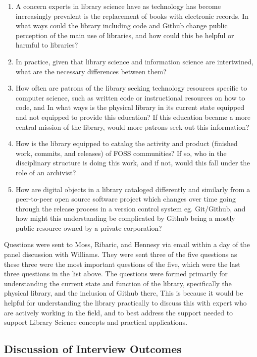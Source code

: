 \begin{enumerate}
  \item A concern experts in library science have as technology has become increasingly prevalent is the replacement of books with electronic records. In what ways could the library including code and Github change public perception of the main use of libraries, and how could this be helpful or harmful to libraries?
  \item In practice, given that library science and information science are intertwined, what are the necessary differences between them? 
  \item How often are patrons of the library seeking technology resources specific to computer science, such as written code or instructional resources on how to code, and In what ways is the physical library in its current state equipped and not equipped to provide this education? If this education became a more central mission of the library, would more patrons seek out this information? 
  \item How is the library equipped to catalog the activity and product (finished work, commits, and releases) of FOSS communities? If so, who in the disciplinary structure is doing this work, and if not, would this fall under the role of an archivist? 
  \item How are digital objects in a library cataloged differently and similarly from a peer-to-peer open source software project which changes over time going through the release process in a version control system eg. Git/Github, and how might this understanding be complicated by Github being a mostly public resource owned by a private corporation? 
\end{enumerate}

Questions were sent to Moss, Ribaric, and Hennesy via email within a day of the panel discussion with Williams. They were sent three of the five questions as these three were the most important questions of the five, which were the last three questions in the list above. The questions were formed primarily for understanding the current state and function of the library, specifically the physical library, and the inclusion of Github there, This is because it would be helpful for understanding the library practically to discuss this with expert who are actively working in the field, and to best address the support needed to support Library Science concepts and practical applications. 

\subsection{Discussion of Interview Outcomes}

